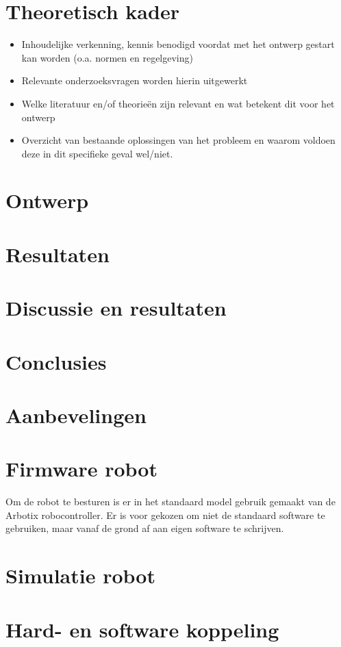 \documentclass[10pt,a4paper]{article}
\begin{document}
\section{Theoretisch kader}
\begin{itemize}
\setlength\itemsep{0em}
\item Inhoudelijke verkenning, kennis benodigd voordat met het ontwerp gestart kan worden (o.a. normen en regelgeving)
\item Relevante onderzoeksvragen worden hierin uitgewerkt 
\item Welke literatuur en/of theorieën zijn relevant en wat betekent dit voor het ontwerp \item Overzicht van bestaande oplossingen van het probleem en waarom voldoen deze in dit specifieke geval wel/niet.
\end{itemize}
\newpage

\section{Ontwerp}
\newpage

\section{Resultaten}
\section{Discussie en resultaten}
\section{Conclusies}
\section{Aanbevelingen}

\section{Firmware robot}
Om de robot te besturen is er in het standaard model gebruik gemaakt van de Arbotix robocontroller. 
Er is voor gekozen om niet de standaard software te gebruiken, maar vanaf de grond af aan eigen software te schrijven.

\section{Simulatie robot}
\section{Hard- en software koppeling}
\end{document}
